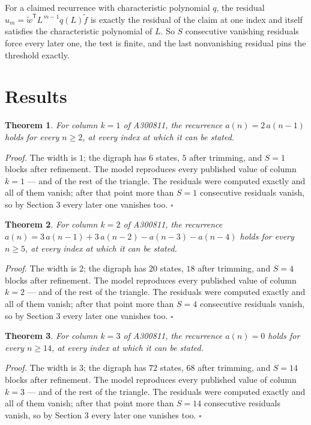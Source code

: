\documentclass[11pt]{article}
\newtheorem{theorem}{Theorem}
\theoremstyle{definition}
\begin{document}
For a claimed recurrence with characteristic polynomial $q$, the residual $u_m = \tilde w^{\mathsf T}L^{\,m-1}q(L)\tilde f$ is exactly the residual of the claim at one index and itself satisfies the characteristic polynomial of $L$. So $S$ consecutive vanishing residuals force every later one, the test is finite, and the last nonvanishing residual pins the threshold exactly.

\section{Results}

\begin{theorem} For column $k = 1$ of A300811, the recurrence $a(n) = 2\,a(n-1)$ holds for every $n \ge 2$, at every index at which it can be stated.\end{theorem}

{\itshape Proof.} The width is $1$; the digraph has $6$ states, $5$ after trimming, and $S = 1$ blocks after refinement. The model reproduces every published value of column $k = 1$ --- and of the rest of the triangle. The residuals were computed exactly and all of them vanish; after that point more than $S = 1$ consecutive residuals vanish, so by Section 3 every later one vanishes too. $\square$

\begin{theorem} For column $k = 2$ of A300811, the recurrence $a(n) = 3\,a(n-1) + 3\,a(n-2) - a(n-3) - a(n-4)$ holds for every $n \ge 5$, at every index at which it can be stated.\end{theorem}

{\itshape Proof.} The width is $2$; the digraph has $20$ states, $18$ after trimming, and $S = 4$ blocks after refinement. The model reproduces every published value of column $k = 2$ --- and of the rest of the triangle. The residuals were computed exactly and all of them vanish; after that point more than $S = 4$ consecutive residuals vanish, so by Section 3 every later one vanishes too. $\square$

\begin{theorem} For column $k = 3$ of A300811, the recurrence $a(n) = 0$ holds for every $n \ge 14$, at every index at which it can be stated.\end{theorem}

{\itshape Proof.} The width is $3$; the digraph has $72$ states, $68$ after trimming, and $S = 14$ blocks after refinement. The model reproduces every published value of column $k = 3$ --- and of the rest of the triangle. The residuals were computed exactly and all of them vanish; after that point more than $S = 14$ consecutive residuals vanish, so by Section 3 every later one vanishes too. $\square$
\end{document}
